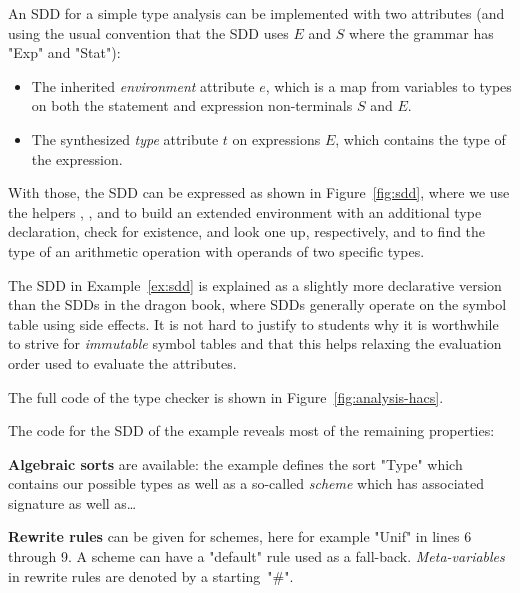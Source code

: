 \documentclass[11pt]{article} %
\begin{document}
\begin{example}\label{ex:sdd}
  An SDD for a simple type analysis can be implemented with two attributes (and using the usual
  convention that the SDD uses $E$ and $S$ where the \HAX grammar has "Exp" and "Stat"):
  \begin{itemize}

  \item The inherited \emph{environment} attribute $e$, which is a map from variables to types on
    both the statement and expression non-terminals $S$ and $E$.

  \item The synthesized \emph{type} attribute $t$ on expressions $E$, which contains the type of the
    expression.

  \end{itemize}
  With those, the SDD can be expressed as shown in Figure~\ref{fig:sdd}, where we use the helpers
  , , and  to build an extended environment with an additional
  type declaration, check for existence, and look one up, respectively, and  to find the
  type of an arithmetic operation with operands of two specific types.
\end{example}

The SDD in Example~\ref{ex:sdd} is explained as a slightly more declarative version than the SDDs in
the dragon book, where SDDs generally operate on the symbol table using side effects.  It is not
hard to justify to students why it is worthwhile to strive for \emph{immutable} symbol tables and
that this helps relaxing the evaluation order used to evaluate the attributes.

\begin{example}\label{ex:analysis-hacs}
  The full \HAX code of the type checker is shown in Figure~\ref{fig:analysis-hacs}.
\end{example}

The \HAX code for the SDD of the example reveals most of the remaining \HAX properties:

\smallskip\noindent\textbf{Algebraic sorts} are available: the example defines the sort "Type" which contains our
  possible types as well as a so-called \emph{scheme} which has associated signature as well as…

\smallskip\noindent\textbf{Rewrite rules} can be given for schemes, here for example "Unif" in lines 6 through 9.  A
  scheme can have a "default" rule used as a fall-back.  \emph{Meta-variables} in rewrite rules are
  denoted by a starting~"#".
\end{document}
